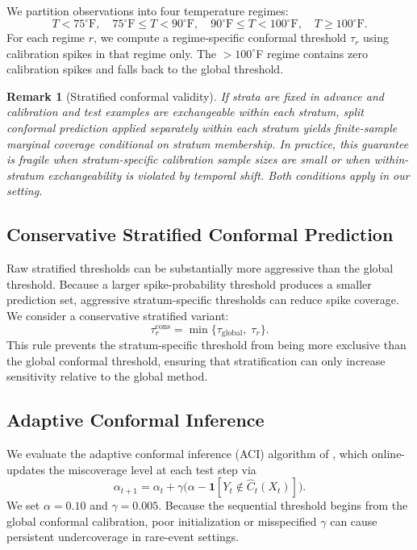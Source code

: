 \documentclass{article}
\newtheorem{remark}{Remark}
\begin{document}
We partition observations into four temperature regimes:
\[
    T < 75^{\circ}\mathrm{F}, \quad
    75^{\circ}\mathrm{F} \leq T < 90^{\circ}\mathrm{F}, \quad
    90^{\circ}\mathrm{F} \leq T < 100^{\circ}\mathrm{F}, \quad
    T \geq 100^{\circ}\mathrm{F}.
\]
For each regime $r$, we compute a regime-specific conformal threshold
$\tau_r$ using calibration spikes in that regime only. The $>100^{\circ}$F
regime contains zero calibration spikes and falls back to the global threshold.

\begin{remark}[Stratified conformal validity]
If strata are fixed in advance and calibration and test examples are
exchangeable within each stratum, split conformal prediction applied
separately within each stratum yields finite-sample marginal coverage
conditional on stratum membership. In practice, this guarantee is fragile
when stratum-specific calibration sample sizes are small or when within-stratum
exchangeability is violated by temporal shift. Both conditions apply in our
setting.
\end{remark}

\subsection{Conservative Stratified Conformal Prediction}

Raw stratified thresholds can be substantially more aggressive than the global
threshold. Because a larger spike-probability threshold produces a smaller
prediction set, aggressive stratum-specific thresholds can reduce spike
coverage. We consider a conservative stratified variant:
\begin{equation}
    \tau_r^{\mathrm{cons}}
    =
    \min\bigl\{\tau_{\mathrm{global}},\; \tau_r\bigr\}.
\end{equation}
This rule prevents the stratum-specific threshold from being more exclusive
than the global conformal threshold, ensuring that stratification can only
increase sensitivity relative to the global method.

\subsection{Adaptive Conformal Inference}

We evaluate the adaptive conformal inference (ACI) algorithm of
\citet{gibbs2021}, which online-updates the miscoverage level at each test
step via
\begin{equation}
    \alpha_{t+1} = \alpha_t + \gamma \bigl(\alpha - \mathbf{1}[Y_t \notin \hat{C}_t(X_t)]\bigr).
\end{equation}
We set $\alpha = 0.10$ and $\gamma = 0.005$. Because the sequential threshold
begins from the global conformal calibration, poor initialization or
misspecified $\gamma$ can cause persistent undercoverage in rare-event
settings.
\end{document}
